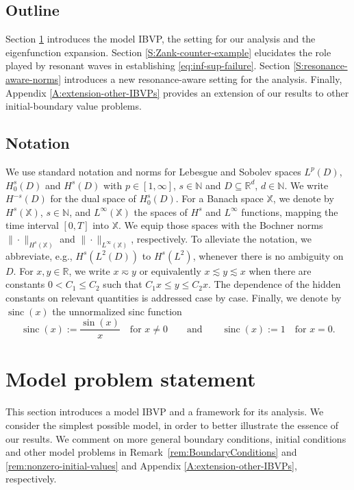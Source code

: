 \documentclass{amsart}
\theoremstyle{plain}
\theoremstyle{remark}
\numberwithin{equation}{section}
\numberwithin{theorem}{section}
\newcommand{\R}{\mathbb{R}}
\newcommand{\N}{\mathbb{N}}
\newcommand{\sinc}{\operatorname{sinc}}
\begin{document}
\subsection*{Outline}
Section \ref{S:model-problem-statement} introduces the model IBVP, the setting for our analysis and the eigenfunction expansion. Section \ref{S:Zank-counter-example} elucidates the role played by resonant waves in establishing \eqref{eq:inf-sup-failure}. Section \ref{S:resonance-aware-norms} introduces a new resonance-aware setting for the analysis. Finally, Appendix \ref{A:extension-other-IBVPs} provides an extension of our results to other initial-boundary value problems.

\subsection*{Notation} We use standard notation and norms for Lebesgue and Sobolev spaces $L^p(D)$, $H^s_0(D)$ and $H^s(D)$ with $p \in [1,\infty]$, $s\in\N$ and $D \subseteq \R^d$, $d\in \N$. We write $H^{-s}(D)$ for the dual space of $H^{s}_0(D)$. For a Banach space $\mathbb X$, we denote by $H^s(\mathbb X)$, $s\in\N$, and $L^\infty(\mathbb X)$ the spaces of $H^s$ and $L^\infty$ functions,  mapping the time interval $[0, T]$ into $\mathbb X$. We equip those spaces with the Bochner norms $\|\cdot\|_{H^s(\mathbb X)}$ and $\|\cdot\|_{L^\infty(\mathbb X)}$, respectively. To alleviate the notation, we abbreviate, e.g., $H^s(L^2(D))$ to $H^s(L^2)$, whenever there is no ambiguity on $D$. For $x, y \in \R$, we write $x \eqsim y$ or equivalently $x\lesssim y \lesssim x$ when there are constants $0 < C_1 \leq C_2$ such that $C_1 x \leq y \leq C_2 x$. The dependence of the hidden constants on relevant quantities is addressed case by case. Finally, we denote by $\sinc(x)$ the unnormalized sinc function
\begin{equation*}
\sinc(x) := \frac{\sin(x)}{x}
\quad \text{for $x\neq 0$} \qquad \text{and} \qquad \sinc(x) := 1 \quad \text{for $x=0$}.
\end{equation*}

\section{Model problem statement}
\label{S:model-problem-statement}
This section introduces a model IBVP and a framework for its analysis. We consider the simplest possible model, in order to better illustrate the essence of our results. We comment on more general boundary conditions, initial conditions and other model problems in Remark~\ref{rem:BoundaryConditions} and \ref{rem:nonzero-initial-values} and Appendix \ref{A:extension-other-IBVPs}, respectively. 
\end{document}
